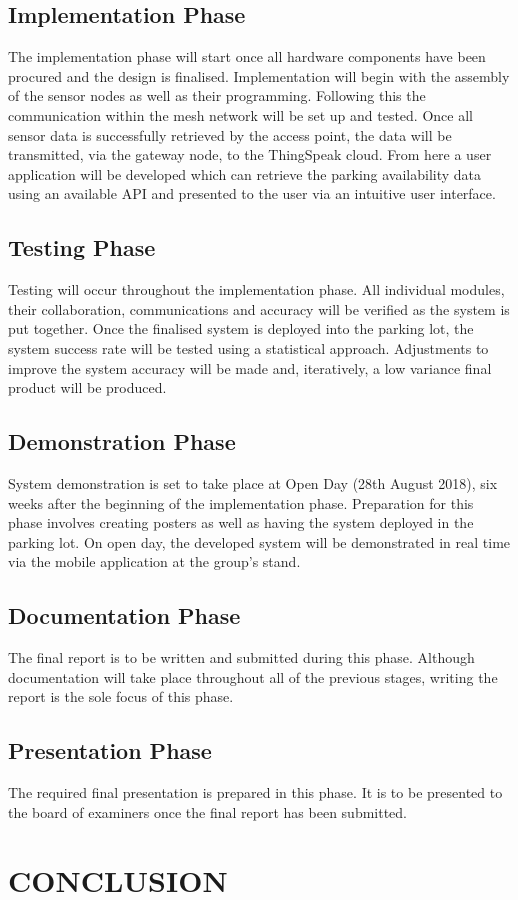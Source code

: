 \documentclass[10pt,twocolumn]{witseiepaper}
\begin{document}
	\subsection{Implementation Phase}
		The implementation phase will start once all hardware components have been procured and the design is finalised. Implementation will begin with the assembly of the sensor nodes as well as their programming. Following this the communication within the mesh network will be set up and tested. Once all sensor data is successfully retrieved by the access point, the data will be transmitted, via the gateway node, to the ThingSpeak cloud. From here a user application will be developed which can retrieve the parking availability data using an available API and presented to the user via an intuitive user interface.
	
	\subsection{Testing Phase}
		Testing will occur throughout the implementation phase. All individual modules, their collaboration, communications and accuracy will be verified as the system is put together. Once the finalised system is deployed into the parking lot, the system success rate will be tested using a statistical approach. Adjustments to improve the system accuracy will be made and, iteratively, a low variance final product will be produced.
		
	\subsection{Demonstration Phase}
		System demonstration is set to take place at Open Day (28th August 2018), six weeks after the beginning of the implementation phase. Preparation for this phase involves creating posters as well as having the system deployed in the parking lot. On open day, the developed system will be demonstrated in real time via the mobile application at the group's stand.
	
	\subsection{Documentation Phase}
		The final report is to be written and submitted during this phase. Although documentation will take place throughout all of the previous stages, writing the report is the sole focus of this phase.
	
	\subsection{Presentation Phase}
		The required final presentation is prepared in this phase. It is to be presented to the board of examiners once the final report has been submitted.
	

\section{CONCLUSION}

{}

\end{document}
